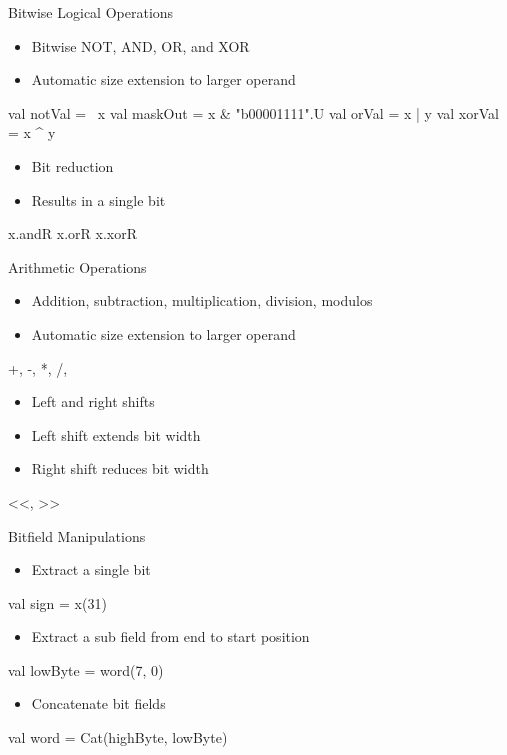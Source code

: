 \begin{frame}[fragile]{Bitwise Logical Operations}
\begin{itemize}
\item Bitwise NOT, AND, OR, and XOR
\item Automatic size extension to larger operand
\end{itemize}
\begin{chisel}
val notVal = ~x
val maskOut = x & "b00001111".U
val orVal = x | y
val xorVal = x ^ y
\end{chisel}
\begin{itemize}
\item Bit reduction
\item Results in a single bit
\end{itemize}
\begin{chisel}
x.andR
x.orR
x.xorR
\end{chisel}
\end{frame}

\begin{frame}[fragile]{Arithmetic Operations}
\begin{itemize}
\item Addition, subtraction, multiplication, division, modulos
\item Automatic size extension to larger operand
\end{itemize}
\begin{chisel}
+, -, *, /, %
\end{chisel}
\begin{itemize}
\item Left and right shifts
\item Left shift extends bit width
\item Right shift reduces bit width
\end{itemize}
\begin{chisel}
<<, >>
\end{chisel}
\end{frame}

\begin{frame}[fragile]{Bitfield Manipulations}
\begin{itemize}
\item Extract a single bit
\end{itemize}
\begin{chisel}
val sign = x(31)
\end{chisel}
\begin{itemize}
\item Extract a sub field from end to start position
\end{itemize}
\begin{chisel}
val lowByte = word(7, 0)
\end{chisel}
\begin{itemize}
\item Concatenate bit fields
\end{itemize}
\begin{chisel}
val word = Cat(highByte, lowByte)
\end{chisel}
\end{frame}

